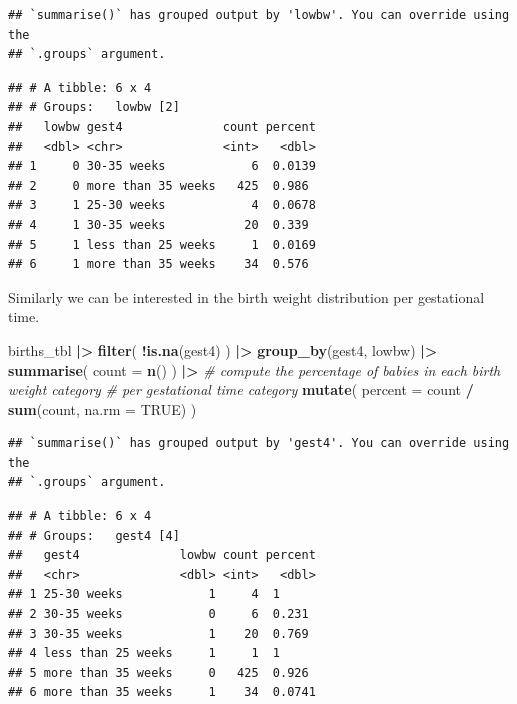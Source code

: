 \documentclass[
]{book}
\newenvironment{Shaded}{\begin{snugshade}}{\end{snugshade}}
\newcommand{\AttributeTok}[1]{\textcolor[rgb]{0.13,0.29,0.53}{#1}}
\newcommand{\CommentTok}[1]{\textcolor[rgb]{0.56,0.35,0.01}{\textit{#1}}}
\newcommand{\ConstantTok}[1]{\textcolor[rgb]{0.56,0.35,0.01}{#1}}
\newcommand{\FunctionTok}[1]{\textcolor[rgb]{0.13,0.29,0.53}{\textbf{#1}}}
\newcommand{\NormalTok}[1]{#1}
\newcommand{\SpecialCharTok}[1]{\textcolor[rgb]{0.81,0.36,0.00}{\textbf{#1}}}
\begin{document}
\begin{verbatim}
## `summarise()` has grouped output by 'lowbw'. You can override using the
## `.groups` argument.
\end{verbatim}

\begin{verbatim}
## # A tibble: 6 x 4
## # Groups:   lowbw [2]
##   lowbw gest4              count percent
##   <dbl> <chr>              <int>   <dbl>
## 1     0 30-35 weeks            6  0.0139
## 2     0 more than 35 weeks   425  0.986 
## 3     1 25-30 weeks            4  0.0678
## 4     1 30-35 weeks           20  0.339 
## 5     1 less than 25 weeks     1  0.0169
## 6     1 more than 35 weeks    34  0.576
\end{verbatim}

Similarly we can be interested in the birth weight distribution per gestational time.

\begin{Shaded}
\begin{Highlighting}[]
\NormalTok{births\_tbl }\SpecialCharTok{|\textgreater{}}
  \FunctionTok{filter}\NormalTok{(}
    \SpecialCharTok{!}\FunctionTok{is.na}\NormalTok{(gest4)}
\NormalTok{  ) }\SpecialCharTok{|\textgreater{}}
  \FunctionTok{group\_by}\NormalTok{(gest4, lowbw) }\SpecialCharTok{|\textgreater{}}
  \FunctionTok{summarise}\NormalTok{(}
    \AttributeTok{count =} \FunctionTok{n}\NormalTok{()}
\NormalTok{  ) }\SpecialCharTok{|\textgreater{}}
  \CommentTok{\# compute the percentage of babies in each birth weight category}
  \CommentTok{\# per gestational time category}
  \FunctionTok{mutate}\NormalTok{(}
    \AttributeTok{percent =}\NormalTok{ count }\SpecialCharTok{/} \FunctionTok{sum}\NormalTok{(count, }\AttributeTok{na.rm =} \ConstantTok{TRUE}\NormalTok{)}
\NormalTok{  )}
\end{Highlighting}
\end{Shaded}

\begin{verbatim}
## `summarise()` has grouped output by 'gest4'. You can override using the
## `.groups` argument.
\end{verbatim}

\begin{verbatim}
## # A tibble: 6 x 4
## # Groups:   gest4 [4]
##   gest4              lowbw count percent
##   <chr>              <dbl> <int>   <dbl>
## 1 25-30 weeks            1     4  1     
## 2 30-35 weeks            0     6  0.231 
## 3 30-35 weeks            1    20  0.769 
## 4 less than 25 weeks     1     1  1     
## 5 more than 35 weeks     0   425  0.926 
## 6 more than 35 weeks     1    34  0.0741
\end{verbatim}
\end{document}
